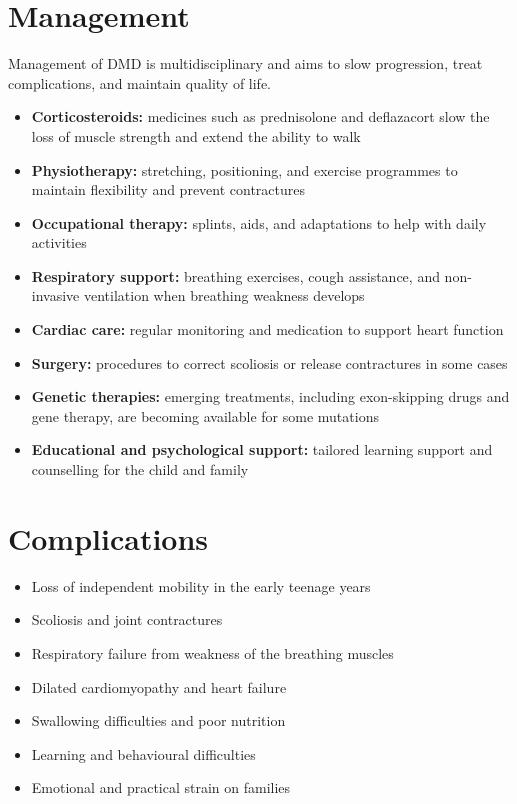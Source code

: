 \section*{Management}
Management of DMD is multidisciplinary and aims to slow progression, treat complications, and maintain quality of life.
\begin{itemize}
    \item \textbf{Corticosteroids:} medicines such as prednisolone and deflazacort slow the loss of muscle strength and extend the ability to walk
    \item \textbf{Physiotherapy:} stretching, positioning, and exercise programmes to maintain flexibility and prevent contractures
    \item \textbf{Occupational therapy:} splints, aids, and adaptations to help with daily activities
    \item \textbf{Respiratory support:} breathing exercises, cough assistance, and non-invasive ventilation when breathing weakness develops
    \item \textbf{Cardiac care:} regular monitoring and medication to support heart function
    \item \textbf{Surgery:} procedures to correct scoliosis or release contractures in some cases
    \item \textbf{Genetic therapies:} emerging treatments, including exon-skipping drugs and gene therapy, are becoming available for some mutations
    \item \textbf{Educational and psychological support:} tailored learning support and counselling for the child and family
\end{itemize}

\section*{Complications}
\begin{itemize}
    \item Loss of independent mobility in the early teenage years
    \item Scoliosis and joint contractures
    \item Respiratory failure from weakness of the breathing muscles
    \item Dilated cardiomyopathy and heart failure
    \item Swallowing difficulties and poor nutrition
    \item Learning and behavioural difficulties
    \item Emotional and practical strain on families
\end{itemize}

